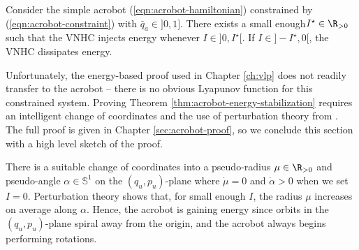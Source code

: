 \begin{thm}\label{thm:acrobot-energy-stabilization}
    Consider the simple acrobot (\ref{eqn:acrobot-hamiltonian}) constrained by
    (\ref{eqn:acrobot-constraint}) with \(\bar{q}_a \in ]0,1]\).
    There exists a small enough\footnotemark \(I^\star \in \R_{>0}\)
    such that the VNHC injects energy whenever \( I \in ]0,I^\star[\). 
    If \(I \in ]-I^\star,0[\), the VNHC dissipates energy.
\end{thm}

Unfortunately, the energy-based proof used in Chapter \ref{ch:vlp} does not
readily transfer to the acrobot -- there is no obvious Lyapunov function for
this constrained system.
Proving Theorem \ref{thm:acrobot-energy-stabilization} requires an intelligent
change of coordinates and the use of perturbation theory from
\cite{khalil_nonlinear}.
The full proof is given in Chapter \ref{sec:acrobot-proof}, so 
we conclude this section with a high level sketch of the proof.

There is a suitable change of coordinates into a pseudo-radius 
\(\mu \in \R_{>0}\) and pseudo-angle \(\alpha \in \mathbb{S}^1\) on the
\((q_u,p_u)\)-plane where \(\dot{\mu} = 0\) and \(\dot{\alpha} > 0\) when 
we set \(I = 0\).
Perturbation theory shows that, for small enough \(I\), the radius \(\mu\)
increases on average along \(\alpha\).
Hence, the acrobot is gaining energy since orbits in the \((q_u,p_u)\)-plane
spiral away from the origin, and the acrobot always begins performing rotations.
 
